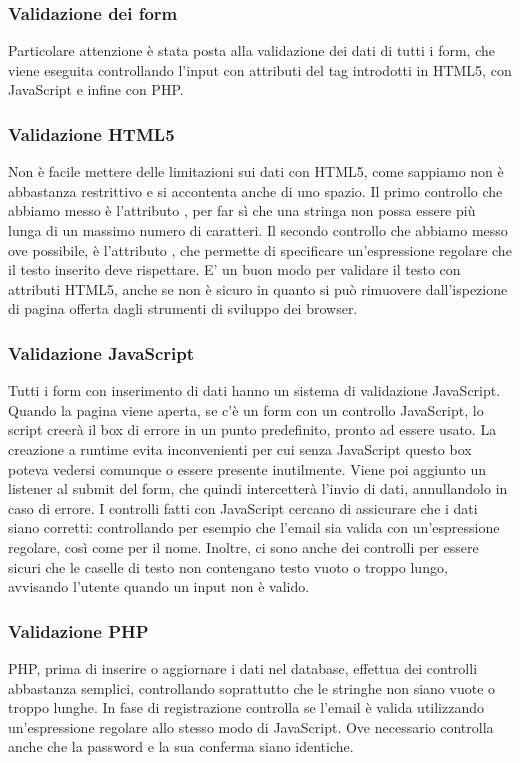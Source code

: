 \documentclass[12pt]{article}
\begin{document}
	\subsubsection{Validazione dei form}
	Particolare attenzione è stata posta alla validazione dei dati di tutti i form, che viene eseguita controllando l'input con attributi del tag  introdotti in HTML5, con JavaScript e infine con PHP. 
	
	\subsubsection{Validazione HTML5}
	Non è facile mettere delle limitazioni sui dati con HTML5, come sappiamo  non è abbastanza restrittivo e si accontenta anche di uno spazio. Il primo controllo che abbiamo messo è l'attributo , per far sì che una stringa non possa essere più lunga di un massimo numero di caratteri. Il secondo controllo che abbiamo messo ove possibile, è l'attributo , che permette di specificare un'espressione regolare che il testo inserito deve rispettare. E' un buon modo per validare il testo con attributi HTML5, anche se non è sicuro in quanto si può rimuovere dall'ispezione di pagina offerta dagli strumenti di sviluppo dei browser.
	
	\subsubsection{Validazione JavaScript}
	Tutti i form con inserimento di dati hanno un sistema di validazione JavaScript. Quando la pagina viene aperta, se c'è un form con un controllo JavaScript, lo script creerà il box di errore in un punto predefinito, pronto ad essere usato. La creazione a runtime evita inconvenienti per cui senza JavaScript questo box poteva vedersi comunque o essere presente inutilmente. Viene poi aggiunto un listener al submit del form, che quindi intercetterà l'invio di dati, annullandolo in caso di errore. I controlli fatti con JavaScript cercano di assicurare che i dati siano corretti: controllando per esempio che l'email sia valida con un'espressione regolare, così come per il nome. Inoltre, ci sono anche dei controlli per essere sicuri che le caselle di testo non contengano testo vuoto o troppo lungo, avvisando l'utente quando un input non è valido.
	
	\subsubsection{Validazione PHP}
	PHP, prima di inserire o aggiornare i dati nel database, effettua dei controlli abbastanza semplici, controllando soprattutto che le stringhe non siano vuote o troppo lunghe. In fase di registrazione controlla se l'email è valida utilizzando un'espressione regolare allo stesso modo di JavaScript. Ove necessario controlla anche che la password e la sua conferma siano identiche.
	
\end{document}
